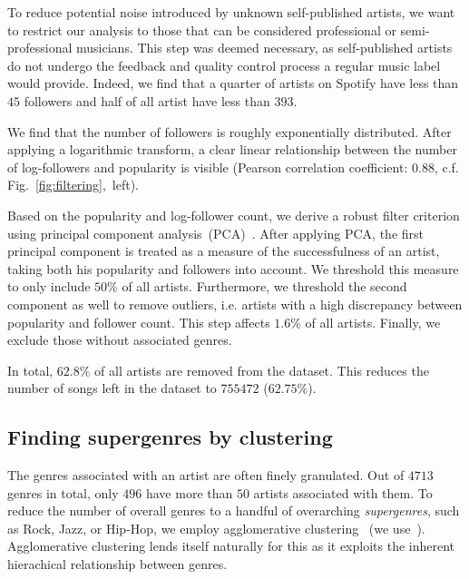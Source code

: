 \documentclass{article}
\begin{document}

To reduce potential noise introduced by unknown self-published artists, we want to restrict our analysis to those that can be considered professional or semi-professional musicians. This step was deemed necessary, as self-published artists do not undergo the feedback and quality control process a regular music label would provide. Indeed, we find that a quarter of artists on Spotify have less than $45$ followers and half of all artist have less than $393$.

We find that the number of followers is roughly exponentially distributed. After applying a logarithmic transform, a clear linear relationship between the number of log-followers and popularity is visible (Pearson correlation coefficient: $0.88$, c.f. Fig.~\ref{fig:filtering},~left). 

Based on the popularity and log-follower count, we derive a robust filter criterion using principal component analysis~(PCA)~\cite{jolliffe2016principal}. After applying PCA, the first principal component is treated as a measure of the successfulness of an artist, taking both his popularity and followers into account. We threshold this measure to only include $50\%$ of all artists. Furthermore, we threshold the second component as well to remove outliers, i.e. artists with a high discrepancy between popularity and follower count. This step affects $1.6\%$ of all artists. Finally, we exclude those without associated genres.

In total, $62.8\%$ of all artists are removed from the dataset. This reduces the number of songs left in the dataset to $755472$ ($62.75\%$).

\subsection{Finding supergenres by clustering}
\label{sec:genre_clustering}
The genres associated with an artist are often finely granulated. Out of $4713$ genres in total, only $496$ have more than $50$ artists associated with them. To reduce the number of overall genres to a handful of overarching \emph{supergenres}, such as Rock, Jazz, or Hip-Hop, we employ agglomerative clustering~\cite{ward1963hierarchical} (we use~\cite{scikit-learn}). Agglomerative clustering lends itself naturally for this as it exploits the inherent hierachical relationship between genres.
\end{document}
